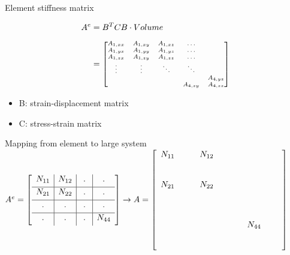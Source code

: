 \documentclass[screen]{beamer}
\begin{document}
\begin{frame}
Element stiffness matrix

\begin{align*}
A^e &= B^T C B \cdot Volume \\[0.5em]
 &= \scriptsize
\begin{bmatrix}
A_{1,xx} & A_{1,xy} & A_{1,xz} &\hdots & \\
A_{1,yx} & A_{1,yy} & A_{1,yz} &\hdots & \\
A_{1,zx} & A_{1,zy} & A_{1,zz} &\hdots & \\
\vdots & \vdots & \ddots & \ddots & \\
& & & & A_{4,yz} \\
 & & & A_{4,zy} & A_{4,zz}
\end{bmatrix}  
\end{align*}
\begin{itemize}
\item B: strain-displacement matrix
\item C: stress-strain matrix
\end{itemize}
\end{frame}

\begin{frame}
Mapping from element to large system
\\[1em]
\scriptsize
$
A^e = \left[
\begin{array}{c|c|c|c}
  {N_{11}} & N_{12} & \, \, . \, \, & . \\[0.3em] \hline
  N_{21} & N_{22} & . & . \\[0.3em] \hline 
  . & . & . & . \\[0.3em] \hline
  . & . & . & N_{44}\\[0.3em]
\end{array} \right] \rightarrow
A = \left[
\begin{array}{c c c c c c c c c c}
N_{11} &  &  & N_{12} &  & & & & &\\
\\
\\
N_{21} & & & N_{22} \\
\\
\\
\\
 & & & & & & &   N_{44}\\
\\
\\
\end{array}\right]
$

\end{frame}


\end{document}
